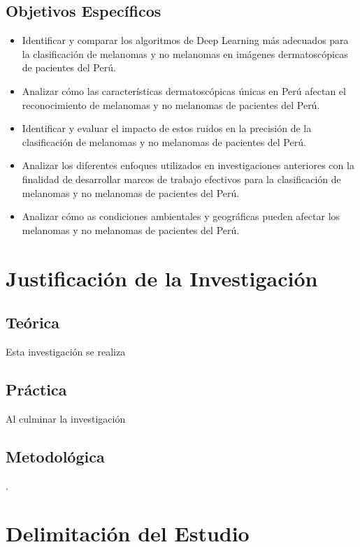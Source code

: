 \subsection{Objetivos Espec\'{i}ficos}
\newcommand{\Objone}{
Identificar y comparar los algoritmos de Deep Learning más adecuados para la clasificación de melanomas y no melanomas en imágenes dermatoscópicas de pacientes del Perú.
}
\newcommand{\Objtwo}{
Analizar cómo las características dermatoscópicas únicas en Perú afectan el reconocimiento de melanomas y no melanomas de pacientes del Perú.
}
\newcommand{\Objthree}{
Identificar y evaluar el impacto de estos ruidos en la precisión de la clasificación de melanomas y no melanomas de pacientes del Perú.
}
\newcommand{\Objfour}{
Analizar los diferentes enfoques utilizados en investigaciones anteriores con la finalidad de desarrollar marcos de trabajo efectivos para la clasificación de melanomas y no melanomas de pacientes del Perú.
}
\newcommand{\Objfive}{
Analizar cómo as condiciones ambientales y geográficas pueden afectar los melanomas y no melanomas de pacientes del Perú.
}

\begin{itemize}
	\item {\Objone}
	\item {\Objtwo}
	\item {\Objthree}
	\item {\Objfour}
	\item {\Objfive}
\end{itemize}

\section{Justificación de la Investigación}

\subsection{Teórica}
Esta investigación se realiza 

\subsection{Práctica}
Al culminar la investigación 

\subsection{Metodológica}. 

\section{Delimitación del Estudio}

